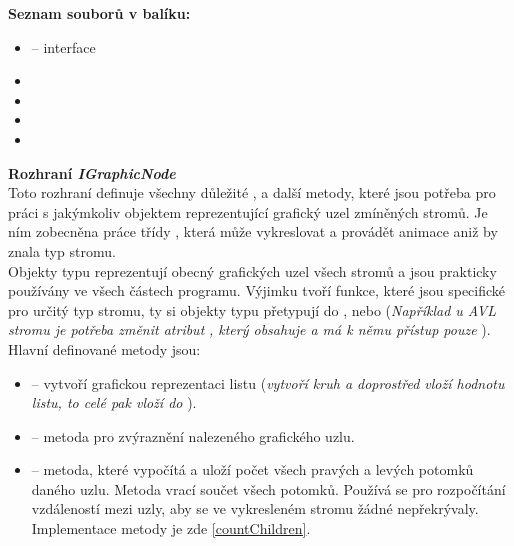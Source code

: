 \documentclass[
  biblatex=false,
  font=serif,
  glossaries=false,
  tables=false,
  theorems=false,
  index
]{kidiplom}
\begin{document}
\noindent \textbf{Seznam souborů v balíku:}
\begin{itemize}
\item {} -- interface
\item {}
\item {}
\item {}
\item {}
\end{itemize}
\smallskip
\noindent \textbf{Rozhraní \textit{IGraphicNode}} \label{IGraphicNode}\\
\indent Toto rozhraní definuje všechny důležité ,  a další metody, které jsou potřeba pro práci s jakýmkoliv objektem reprezentující grafický uzel zmíněných stromů. Je ním zobecněna práce třídy , která může vykreslovat a provádět animace aniž by znala typ stromu.\\
\indent Objekty typu  reprezentují obecný grafických uzel všech stromů a jsou prakticky používány ve všech částech programu. Výjimku tvoří funkce, které jsou specifické pro určitý typ stromu, ty si objekty typu  přetypují do ,  nebo  (\textit{Například u AVL stromu je potřeba změnit atribut}  \textit{, který obsahuje a má k němu přístup pouze} ).\\
\newpage
\noindent Hlavní definované metody jsou:
\begin{itemize}
\item {} -- vytvoří grafickou reprezentaci listu (\textit{vytvoří kruh a doprostřed vloží hodnotu listu, to celé pak vloží do} ).
\item {} -- metoda pro zvýraznění nalezeného grafického uzlu.
\item {} -- metoda, které vypočítá a uloží počet všech pravých a levých potomků daného uzlu. Metoda vrací součet všech potomků. Používá se pro rozpočítání vzdáleností mezi uzly, aby se ve vykresleném stromu žádné nepřekrývaly. Implementace metody je zde \ref{countChildren}.
\end{itemize}
\end{document}
